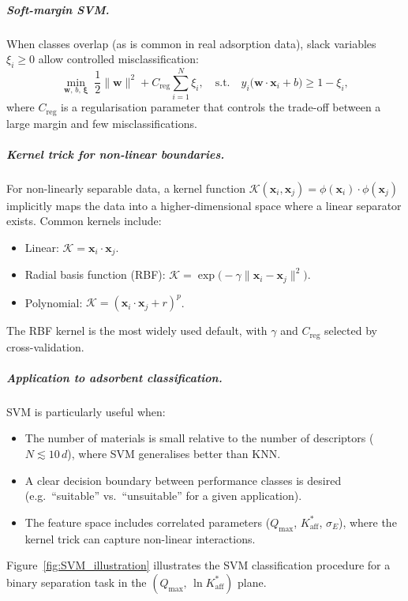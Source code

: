 \documentclass[12pt]{article}
\begin{document}
	\subparagraph{Soft-margin SVM.}
	When classes overlap (as is common in real adsorption data),
	slack variables $\xi_i \ge 0$ allow controlled misclassification:
	\begin{equation}
		\min_{\mathbf{w},\,b,\,\boldsymbol{\xi}}\;
		\frac{1}{2}\|\mathbf{w}\|^2
		+ C_{\mathrm{reg}}\sum_{i=1}^{N}\xi_i,
		\quad\text{s.t.}\quad
		y_i\bigl(\mathbf{w}\cdot\mathbf{x}_i + b\bigr)
		\ge 1 - \xi_i,
		\label{eq:SVM_soft}
	\end{equation}
	where $C_{\mathrm{reg}}$ is a regularisation parameter that
	controls the trade-off between a large margin and few
	misclassifications.

	\subparagraph{Kernel trick for non-linear boundaries.}
	For non-linearly separable data, a kernel function
	$\mathcal{K}(\mathbf{x}_i, \mathbf{x}_j)
	= \phi(\mathbf{x}_i)\cdot\phi(\mathbf{x}_j)$
	implicitly maps the data into a higher-dimensional space where
	a linear separator exists. Common kernels include:
	\begin{itemize}
		\item Linear: $\mathcal{K} = \mathbf{x}_i \cdot \mathbf{x}_j$.
		\item Radial basis function (RBF):
		$\mathcal{K} = \exp\!\bigl(-\gamma\|\mathbf{x}_i
		- \mathbf{x}_j\|^2\bigr)$.
		\item Polynomial:
		$\mathcal{K} = (\mathbf{x}_i\cdot\mathbf{x}_j + r)^p$.
	\end{itemize}
	The RBF kernel is the most widely used default, with
	$\gamma$ and $C_{\mathrm{reg}}$ selected by cross-validation.

	\subparagraph{Application to adsorbent classification.}
	SVM is particularly useful when:
	\begin{itemize}
		\item The number of materials is small relative to the number
		of descriptors ($N \lesssim 10\,d$), where SVM generalises
		better than KNN.
		\item A clear decision boundary between performance classes
		is desired (e.g.\ ``suitable'' vs.\ ``unsuitable'' for a
		given application).
		\item The feature space includes correlated parameters
		($Q_{\max}$, $K_{\mathrm{aff}}^{\ast}$, $\sigma_E$),
		where the kernel trick can capture non-linear interactions.
	\end{itemize}

	Figure~\ref{fig:SVM_illustration} illustrates the SVM
	classification procedure for a binary separation task in
	the $(Q_{\max},\, \ln K_{\mathrm{aff}}^{\ast})$ plane.
\end{document}
